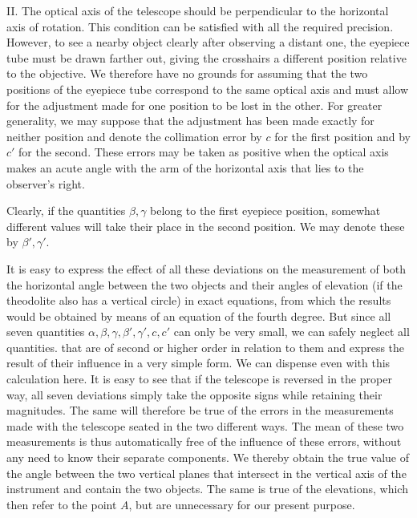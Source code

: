 II. The optical axis of the telescope should be perpendicular to the horizontal axis of rotation. This condition can be satisfied with all the required precision. However, to see a nearby object clearly after observing a distant one, the eyepiece tube must be drawn farther out, giving the crosshairs a different position relative to the objective. We therefore have no grounds for assuming that the two positions of the eyepiece tube correspond to the same optical axis and must allow for the adjustment made for one position to be lost in the other. For greater generality, we may suppose that the adjustment has been made exactly for neither position and denote the collimation error by $c$ for the first position and by $c'$ for the second. These errors may be taken as positive when the optical axis makes an acute angle with the arm of the horizontal axis that lies to the observer’s right.

Clearly, if the quantities $\beta,\gamma$ belong to the first eyepiece position, somewhat different values will take their place in the second position. We may denote these by $\beta',\gamma'$.

It is easy to express the effect of all these deviations on the measurement of both the horizontal angle between the two objects and their angles of elevation (if the theodolite also has a vertical circle) in exact equations, from which the results would be obtained by means of an equation of the fourth degree. But since all seven quantities $\alpha,\beta,\gamma,\beta',\gamma',c,c'$ can only be very small, we can safely neglect all quantities. that are of second or higher order in relation to them and express the result of their influence in a very simple form. We can dispense even with this calculation here. It is easy to see that if the telescope is reversed in the proper way, all seven deviations simply take the opposite signs while retaining their magnitudes. The same will therefore be true of the errors in the measurements made with the telescope seated in the two different ways. The mean of these two measurements is thus automatically free of the influence of these errors, without any need to know their separate components. We thereby obtain the true value of the angle between the two vertical planes that intersect in the vertical axis of the instrument and contain the two objects. The same is true of the elevations, which then refer to the point $A$, but are unnecessary for our present purpose.

